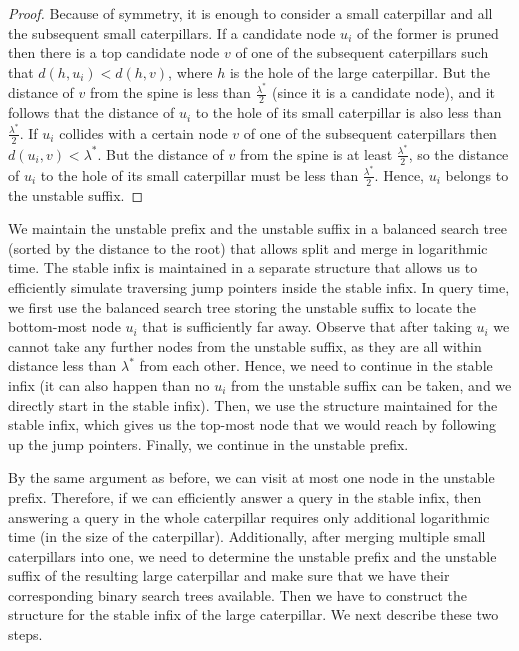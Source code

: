 \documentclass[11pt,a4paper]{article}
\theoremstyle{definition}
\theoremstyle{remark}
\begin{document}
\begin{proof}
Because of symmetry, it is enough to consider a small caterpillar and all the subsequent
small caterpillars. If a candidate node $u_{i}$ of the former is pruned then there is a top candidate node
$v$ of one of the subsequent caterpillars such that $d(h,u_{i}) < d(h,v)$, where $h$ is the hole
of the large caterpillar. But the distance of $v$ from the spine is less than $\frac{\lambda^{*}}{2}$ (since it is a candidate node),
 and it follows that the distance of $u_{i}$ to the hole of its small caterpillar is also less
than $\frac{\lambda^{*}}{2}$. If $u_{i}$ collides with a certain node $v$ of one of the subsequent
caterpillars then $d(u_{i},v)<\lambda^{*}$. But the distance of $v$ from the spine is at least
$\frac{\lambda^{*}}{2}$, so the distance of $u_{i}$ to the hole of its small caterpillar must be
less than $\frac{\lambda^{*}}{2}$. Hence, $u_{i}$ belongs to the unstable suffix.
\end{proof}

We maintain the unstable prefix and the unstable suffix  in a balanced search
tree (sorted by the distance to the root) that allows split and merge in logarithmic time.
The stable infix is maintained in a separate structure that allows us to efficiently simulate traversing jump pointers inside the stable infix. 
%
In query time, we first use the balanced search tree storing the unstable suffix to locate the bottom-most node
$u_{i}$ that is sufficiently far away. Observe that after taking $u_{i}$ we cannot
take any further nodes from the unstable suffix, as they are all within distance less than
$\lambda^{*}$ from each other. Hence, we need to continue in the stable infix (it can also
happen than no $u_{i}$ from the unstable suffix can be taken, and we directly start in the stable
infix). Then, we use the structure maintained for the stable infix, which gives us the top-most
node that we would reach by following up the jump pointers. Finally, we  continue in the unstable prefix. 

By the same argument as before, we can visit at most one node in the unstable prefix.
Therefore, if we can efficiently answer a query in the stable infix, then answering a query in
the whole caterpillar requires only additional logarithmic time (in the size of the caterpillar).
Additionally, after merging multiple small caterpillars into one, we need to determine the unstable
prefix and the unstable suffix of the resulting large caterpillar and make sure that we have
their corresponding binary search trees available.
Then we have to construct the structure for the stable infix of the large caterpillar.
We next describe these two steps.
\end{document}
